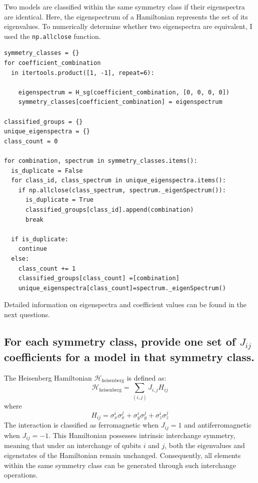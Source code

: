 \documentclass[a4paper, 11pt]{article}
\begin{document}
Two models are classified within the same symmetry class if their eigenspectra are identical. 
Here, the eigenspectrum of a Hamiltonian represents the set of its eigenvalues. To numerically determine whether two eigenspectra are equivalent, I used the \texttt{np.allclose} function.
\begin{verbatim}
symmetry_classes = {}
for coefficient_combination 
  in itertools.product([1, -1], repeat=6):

    eigenspectrum = H_sg(coefficient_combination, [0, 0, 0, 0])
    symmetry_classes[coefficient_combination] = eigenspectrum

classified_groups = {}
unique_eigenspectra = {}
class_count = 0

for combination, spectrum in symmetry_classes.items():
  is_duplicate = False
  for class_id, class_spectrum in unique_eigenspectra.items():
    if np.allclose(class_spectrum, spectrum._eigenSpectrum()):
      is_duplicate = True
      classified_groups[class_id].append(combination)
      break

  if is_duplicate:
    continue
  else:
    class_count += 1
    classified_groups[class_count] =[combination]
    unique_eigenspectra[class_count]=spectrum._eigenSpectrum()
\end{verbatim}

Detailed information on eigenspectra and coefficient values can be found in the next questions.


\subsection*{For each symmetry class, provide one set of $J_{ij}$ coefficients for a model in that symmetry class.}

The Heisenberg Hamiltonian $\mathcal{H}_{\text{heisenberg}}$ is defined as:
\begin{equation}
  \mathcal{H}_{\text{heisenberg}} = \sum_{(i,j)} J_{i,j} H_{ij}
\end{equation}
where
\begin{equation}
  H_{ij} = \sigma_x^i \sigma_x^j + \sigma_y^i \sigma_y^j + \sigma_z^i \sigma_z^j 
\end{equation}
The interaction is classified as ferromagnetic when $J_{ij} = 1$ and antiferromagnetic when $J_{ij} = -1$. 
This Hamiltonian possesses intrinsic interchange symmetry, meaning that under an interchange of qubits $i$ and $j$, 
both the eigenvalues and eigenstates of the Hamiltonian remain unchanged. 
Consequently, all elements within the same symmetry class can be generated through such interchange operations.
\end{document}
